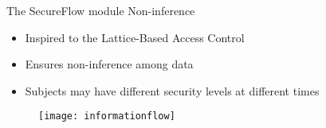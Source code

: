 \begin{frame}{The SecureFlow module \newline Non-inference}
\begin{itemize}
	\item Inspired to the Lattice-Based Access Control
	\item Ensures non-inference among data
	\item Subjects may have different security levels at different times
\end{itemize}
\begin{figure}
	\centering\texttt{[image: informationflow]}
\end{figure}
\end{frame}